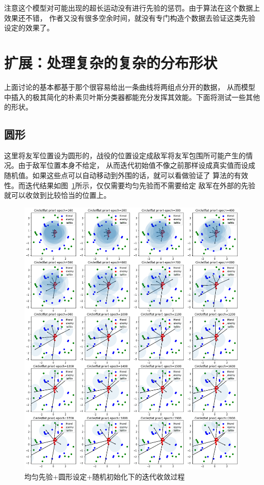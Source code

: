 \documentclass{sicnuthesis}
\begin{document}
注意这个模型对可能出现的超长运动没有进行先验的惩罚。由于算法在这个数据上效果还不错，
作者又没有很多空余时间，就没有专门构造个数据去验证这类先验设定的效果了。

\clearpage
\section{扩展：处理复杂的复杂的分布形状}


上面讨论的基本都基于那个很容易给出一条曲线将两组点分开的数据，
从而模型中插入的极其简化的朴素贝叶斯分类器都能充分发挥其效能。下面将测试一些其他的形状。

\subsection{圆形}


这里将友军位置设为圆形的，战役的位置设定成敌军将友军包围所可能产生的情况。由于敌军位置本身不给定，
从而迭代初始值不像之前那样设成真实值而设成随机值。如果这些点可以自动移动到外围的话，就可以看做验证了
算法的有效性。而迭代结果如图~\ref{fig:circleIteration}所示，仅仅需要均匀先验而不需要给定
敌军在外部的先验就可以收敛到比较恰当的位置上。

\begin{figure}[htb]
\includegraphics[width=0.99\linewidth]{circle_iteration.png}
\caption{
均匀先验+圆形设定+随机初始化下的迭代收敛过程}
\label{fig:circleIteration}
\end{figure}
\end{document}
